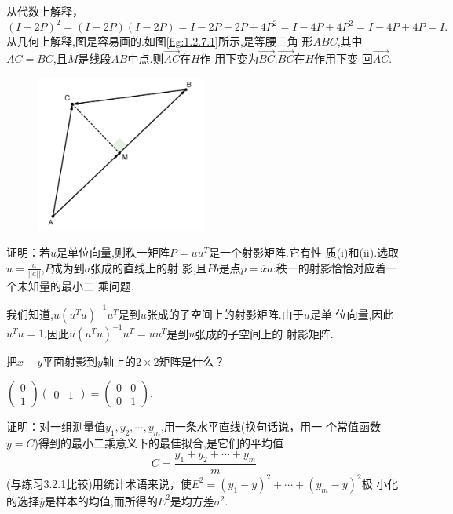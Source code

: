 ﻿\documentclass{book} \usepackage{exsheets} \usepackage{xeCJK}
\begin{document}
\begin{solution}
  从代数上解释，
$$
(I-2P)^2=(I-2P)(I-2P)=I-2P-2P+4P^2=I-4P+4P^2=I-4P+4P=I.
$$
从几何上解释,图是容易画的.如图\eqref{fig:1.2.7.1}所示,是等腰三角
形$ABC$,其中$AC=BC$,且$M$是线段$AB$中点.则$\overrightarrow{AC}$在$H$作
用下变为$\overrightarrow{BC}$.$\overrightarrow{BC}$在$H$作用下变
回$\overrightarrow{AC}$.
\begin{figure}[h]
  \centering
  \includegraphics[width=0.5\textwidth]{1.png}
  \caption{ }
  \label{fig:1.2.7.1}
\end{figure}
\end{solution}
\begin{question}
  证明：若$u$是单位向量,则秩一矩阵$P=uu^T$是一个射影矩阵.它有性
  质(i)和(ii).选取$u=\frac{a}{||a||}$,$P$成为到$a$张成的直线上的射
  影,且$Pb$是点$p=\overline{x}a$:秩一的射影恰恰对应着一个未知量的最小二
  乘问题.
\end{question}
\begin{solution}
  我们知道,$u(u^Tu)^{-1}u^T$是到$u$张成的子空间上的射影矩阵.由于$u$是单
  位向量,因此$u^Tu=1$.因此$u(u^Tu)^{-1}u^T=uu^T$是到$u$张成的子空间上的
  射影矩阵.
\end{solution}
\begin{question}
  把$x-y$平面射影到$y$轴上的$2\times 2$矩阵是什么？
\end{question}
\begin{solution}
  $
  \begin{pmatrix}
    0\\
    1
  \end{pmatrix}
  \begin{pmatrix}
    0&1
  \end{pmatrix}=
  \begin{pmatrix}
    0&0\\
    0&1
  \end{pmatrix}.  $
\end{solution}
\begin{question}
  证明：对一组测量值$y_1,y_2,\cdots,y_m$,用一条水平直线(换句话说，用一
  个常值函数$y=C$)得到的最小二乘意义下的最佳拟合,是它们的平均值
$$
C=\frac{y_1+y_2+\cdots+y_m}{m}
$$
(与练习3.2.1比较)用统计术语来说，使$E^2=(y_1-y)^2+\cdots+(y_m-y)^2$极
小化的选择$\overline{y}$是样本的均值,而所得的$E^2$是均方差$\sigma^2$.
\end{question}
\end{document}
